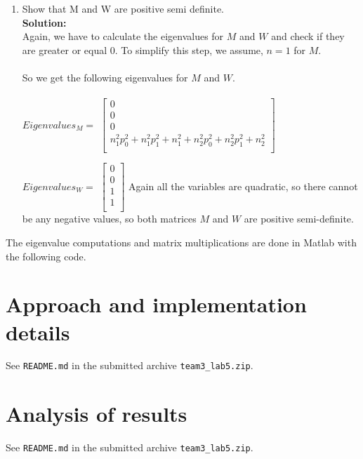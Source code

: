 \documentclass{article}
\newcommand{\code}[1]{\texttt{#1}}
\numberwithin{equation}{section}
\newcommand{\0}{\mathbf{0}}
\begin{document}
\begin{enumerate}
\begin{enumerate}
		\item Show that M and W are positive semi definite. \\
 		\textbf{Solution:}
		\\
		Again, we have to calculate the eigenvalues for $M$ and $W$ and check if they are greater or equal $0$. To simplify this step, we assume, $n=1$ for $M$.
		\\
		\\
		So we get the following eigenvalues for $M$ and $W$. \\ \\
		$Eigenvalues_{M}=$
		$\begin{bmatrix} 
		0 \\
		0 \\
		0\\
		n_1^2 p_0^2 + n_1^2 p_1^2 + n_1^2 + n_2^2 p_0^2+ n_2^2 p_1^2 + n_2^2 \\
		\end{bmatrix}$
		\newline \newline
		
		$Eigenvalues_{W}=$
		$\begin{bmatrix} 
		0 \\
		0 \\
		1\\
		1\\
		\end{bmatrix}$
		\newline \newline
		Again all the variables are quadratic, so there cannot be any negative values, so both matrices $M$ and $W$ are positive semi-definite.	
 		\end{enumerate}
	 	
	 \end{enumerate}
 	The eigenvalue computations and matrix multiplications are done in Matlab with the following code.
 	
 	
 	

	 \section{Approach and implementation details}
	 
	 See \code{README.md} in the submitted archive \code{team3\_lab5.zip}.
	 
	 \section{Analysis of results}
	 
	 See \code{README.md} in the submitted archive \code{team3\_lab5.zip}.

 
		
\end{document}

